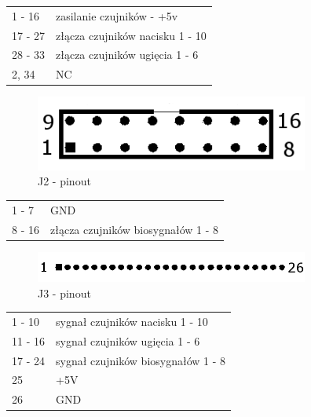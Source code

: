 \documentclass{article}
\begin{document}
\begin{table}[H]
	\centering
	\label{J1 - pinout}
	\begin{tabular}{ll}
	1 - 16		&	zasilanie czujników - +5v		\\
	17 - 27		&	złącza czujników nacisku 1 - 10		\\
	28 - 33		&	złącza czujników ugięcia 1 - 6		\\
	2, 34		&	NC					\\
\end{tabular}
\end{table}

\begin{figure}[H]
	\centering
	\includegraphics[width=9cm]{J2.png}
	\caption{J2 - pinout}
	\label{rys:J2 - pinout}
\end{figure}

\begin{table}[H]
	\centering
	\label{J2 - pinout}
	\begin{tabular}{ll}
	1 - 7		&	GND					\\
	8 - 16		&	złącza czujników biosygnałów 1 - 8	\\
\end{tabular}
\end{table}

\begin{figure}[H]
	\centering
	\includegraphics[width=9cm]{J3.png}
	\caption{J3 - pinout}
	\label{rys:J3 - pinout}
\end{figure}

\begin{table}[H]
	\centering
	\label{J3 - pinout}
	\begin{tabular}{ll}
	1 - 10		&	sygnał czujników nacisku 1 - 10		\\
	11 - 16		&	sygnał czujników ugięcia 1 - 6		\\
	17 - 24		&	sygnał czujników biosygnałów 1 - 8	\\
	25		&	+5V					\\
	26		&	GND					\\
\end{tabular}
\end{table}
\end{document}
